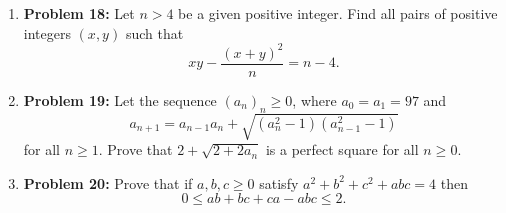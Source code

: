\documentclass{article}
\begin{document}
\begin{enumerate}
    \vspace{3cm}
    
    \item \textbf{Problem 18:} Let \( n > 4 \) be a given positive integer. Find all pairs of positive integers \( (x, y) \) such that
    \[
    xy - \frac{(x + y)^2}{n} = n - 4.
    \]
    
    \vspace{3cm}
    
    \item \textbf{Problem 19:} Let the sequence \( (a_n)_n \geq 0 \), where \( a_0 = a_1 = 97 \) and
    \[ a_{n+1} = a_{n-1}a_n + \sqrt{(a_n^2 - 1)(a_{n-1}^2 - 1)} \]
    for all \( n \geq 1 \). Prove that \( 2 + \sqrt{2 + 2a_n} \) is a perfect square for all \( n \geq 0 \).
    
    \vspace{3cm}
    
    \item \textbf{Problem 20:} Prove that if \( a, b, c \geq 0 \) satisfy \( a^2 + b^2 + c^2 + abc = 4 \) then
    \[
    0 \leq ab + bc + ca - abc \leq 2.
    \]
    
    \vspace{3cm}
    
\end{enumerate}
\end{document}
